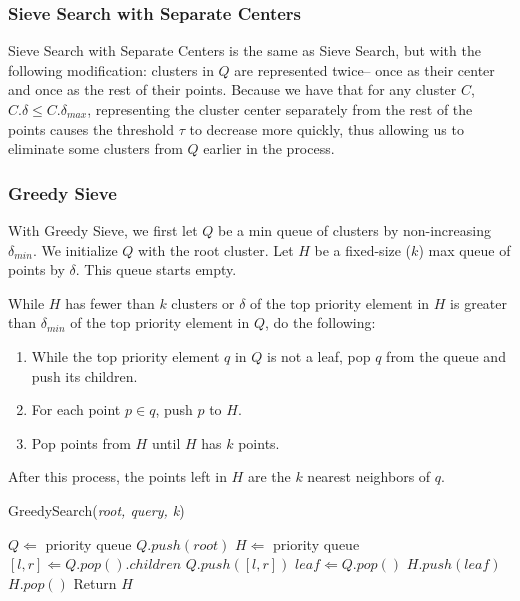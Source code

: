 \subsubsection{Sieve Search with Separate Centers}
\label{subsubsec:methods:knn-search:sieve2}
Sieve Search with Separate Centers is the same as Sieve Search, but with the following modification: clusters 
in $Q$ are represented twice-- once as their center and once as the rest of their points. 
Because we have that for any cluster $C$, $C.\delta \leq C.\delta_{max}$, representing the cluster 
center separately from the rest of the points causes the threshold $\tau$ to decrease more quickly, 
thus allowing us to eliminate some clusters from $Q$ earlier in the process.


\subsubsection{Greedy Sieve}
\label{subsubsec:methods:knn-search:greedy-search}

With Greedy Sieve, we first let $Q$ be a min queue of clusters by non-increasing $\delta_{min}$. We initialize $Q$ with the root cluster.
Let $H$ be a fixed-size ($k$) max queue of points by $\delta$. This queue starts empty.

While $H$ has fewer than $k$ clusters or $\delta$ of the top priority element in $H$ is greater 
than $\delta_{min}$ of the top priority element in $Q$, do the following:
\begin{enumerate}
\item While the top priority element $q$ in $Q$ is not a leaf, pop $q$ from the queue and push its children.
\item For each point $p \in q$, push $p$ to $H$. 
\item Pop points from $H$ until $H$ has $k$ points. 
\end{enumerate}
After this process, the points left in $H$ are the $k$ nearest neighbors of $q$.

\begin{algorithm} 
\caption{GreedySearch(\emph{root, query, k})} 
\label{alg:greedy_search} 
\begin{algorithmic}[3]
    \STATE $Q \Leftarrow$ priority queue
    \STATE $Q.push(root)$
    \STATE $H \Leftarrow$ priority queue
            \STATE $[l, r] \Leftarrow Q.pop().children$
            \STATE $Q.push([l, r])$
        \ENDWHILE
        \STATE $leaf \Leftarrow Q.pop()$
        \STATE $H.push(leaf)$
            \STATE $H.pop()$
        \ENDWHILE
    \ENDWHILE
    \STATE Return $H$
\end{algorithmic}
\end{algorithm}

